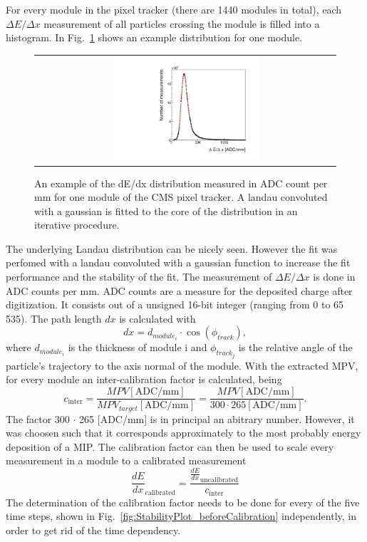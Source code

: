 For every module in the pixel tracker (there are 1440 modules in total), each $\Delta E/\Delta x$ measurement of all particles crossing the module is filled into a histogram. 
In Fig.~\ref{fig:dEdx_Module} shows an example distribution for one module.
\begin{figure}[!bt]
  \centering 
  \begin{tabular}{c}
  \includegraphics[width=0.5\textwidth]{figures/analysis/Landau_Module_352476680.pdf}
  \end{tabular}
  \caption{An example of the dE/dx distribution measured in ADC count per mm for one module of the CMS pixel tracker. 
           A landau convoluted with a gaussian is fitted to the core of the distribution in an iterative procedure.} 
  \label{fig:dEdx_Module}
\end{figure}
The underlying Landau distribution can be nicely seen. 
However the fit was perfomed with a landau convoluted with a gaussian function to increase the fit performance and the stability of the fit.
The measurement of $\Delta E/\Delta x$ is done in ADC counts per mm. 
ADC counts are a measure for the deposited charge after digitization. 
It consists out of a unsigned 16-bit integer (ranging from 0 to 65 535).
The path length $dx$ is calculated with
\begin{equation}
dx = d_{module_i} \cdot \cos(\phi_{track}),
\end{equation}
where $d_{module_i}$ is the thickness of module i and $\phi_{track_j}$ is the relative angle of the particle's trajectory to the axis normal of the module.
With the extracted MPV, for every module an inter-calibration factor is calculated, being
\begin{equation}
c_{\text{inter}}=\frac{MPV [\text{ADC/mm}]}{MPV_{target} [\text{ADC/mm}]} = \frac{MPV [\text{ADC/mm}]}{300 \cdot 265 [\text{ADC/mm}]}.
\end{equation}
The factor 300 $\cdot$ 265 [ADC/mm] is in principal an abitrary number. 
However, it was choosen such that it corresponds approximately to the most probably energy deposition of a MIP.
The calibration factor can then be used to scale every measurement in a module to a calibrated \dedx measurement
\begin{equation}
\frac{dE}{dx}_{\text{calibrated}}=\frac{\frac{dE}{dx}_{\text{uncalibrated}}}{c_{\text{inter}}}
\end{equation}
The determination of the calibration factor needs to be done for every of the five time steps, shown in Fig.~\ref{fig:StabilityPlot_beforeCalibration} independently, in order to get rid of the time dependency. 

